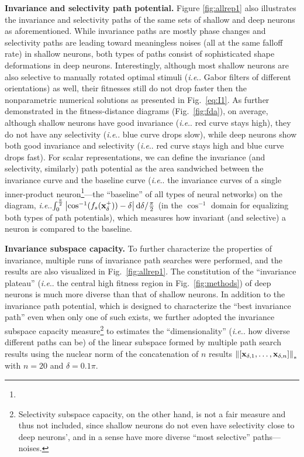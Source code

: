 \documentclass[fleqn]{article} %
\makeatletter
\DeclareRobustCommand\onedot{\futurelet\@let@token\@onedot}
\def\@onedot{\ifx\@let@token.\else.\null\fi\xspace}
\def\ie{\emph{i.e}\onedot} \def\Ie{\emph{I.e}\onedot}
\makeatother
\begin{document}
{\bf Invariance and selectivity path potential.}
Figure \ref{fig:allrep1} also illustrates the invariance and selectivity paths of the same sets of shallow and deep neurons as aforementioned.
While invariance paths are mostly phase changes and selectivity paths are leading toward meaningless noises (all at the same falloff rate) in shallow neurons, both types of paths consist of sophisticated shape deformations in deep neurons.
Interestingly, although most shallow neurons are also selective to manually rotated optimal stimuli (\ie Gabor filters of different orientations) as well, their fitnesses still do not drop faster then the nonparametric numerical solutions as presented in Fig.~\ref{eq:I1}.
As further demonstrated in the fitness-distance diagrams \cite{jones1995fitness} (Fig.~\ref{fig:fda}), on average, although shallow neurons have good invariance (\ie red curve stays high), they do not have any selectivity (\ie blue curve drops slow), while deep neurons show both good invariance and selectivity (\ie red curve stays high and blue curve drops fast).
For scalar representations, we can define the invariance (and selectivity, similarly) path potential as the area sandwiched between the invariance curve and the baseline curve (\ie the invariance curves of a single inner-product neuron\footnote{}---the ``baseline'' of all types of neural networks) on the diagram, \ie $\int_{0}^{\frac{\pi}{2}} \left| \cos^{-1}(f_s(\bf{x}^{+}_{\delta} )) - \delta \right| \mathrm{d}\delta / \frac{\pi}{2}$ (in the $\cos^{-1}$ domain for equalizing both types of path potentials), which measures how invariant (and selective) a neuron is compared to the baseline. %


\newcommand{\expnoslsc}{Selectivity subspace capacity, on the other hand, is not a fair measure and thus not included, since shallow neurons do not even have selectivity close to deep neurons', and in a sense have more diverse ``most selective'' paths---noises.}

{\bf Invariance subspace capacity.}
To further characterize the properties of invariance, multiple runs of invariance path searches {were} performed, and the results are also visualized in Fig.~\ref{fig:allrep1}.
The constitution of the ``invariance plateau'' (\ie the central high fitness region in Fig.~\ref{fig:methods}) of deep neurons is much more diverse than that of shallow neurons.
In addition to the invariance path potential, which is designed to characterize the ``best invariance path'' even when only one of such exists, we further adopted the invariance subspace capacity measure\footnote{\expnoslsc} to estimates the ``dimensionality'' (\ie how diverse different paths can be) of the linear subspace formed by multiple path search results using the nuclear norm of the concatenation of $n$ results $\left\|\left[{\bf{x}}_{\delta,1},\dots,{\bf{x}}_{\delta,n}\right]\right\|_{*}$ with $n=20$ and $\delta=0.1\pi$.
\end{document}

